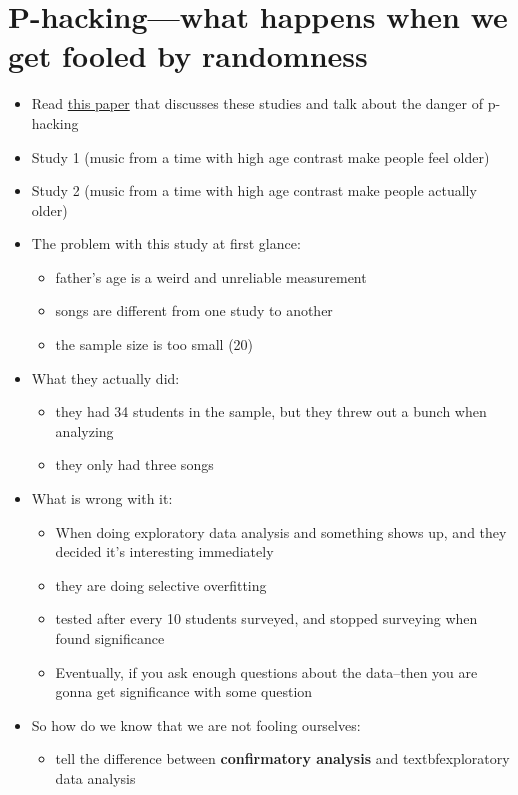 \section{P-hacking---what happens when we get fooled by randomness}
\begin{itemize}
    \item Read \href{https://journals.sagepub.com/doi/10.1177/0956797611417632}{this paper} that discusses these studies and talk about the danger of p-hacking
    \item Study 1 (music from a time with high age contrast make people feel older)
    \item Study 2 (music from a time with high age contrast make people actually older)
    \item The problem with this study at first glance:
    \begin{itemize}
        \item father's age is a weird and unreliable measurement
        \item songs are different from one study to another
        \item the sample size is too small (20)
    \end{itemize}
    \item What they actually did:
    \begin{itemize}
        \item they had 34 students in the sample, but they threw out a bunch when analyzing 
        \item they only had three songs
    \end{itemize}
    \item What is wrong with it:
    \begin{itemize}
        \item When doing exploratory data analysis and something shows up, and they decided it’s interesting immediately 
        \item they are doing selective overfitting
        \item tested after every 10 students surveyed, and stopped surveying when found significance
        \item Eventually, if you ask enough questions about the data--then you are gonna get significance with some question
    \end{itemize}
    \item So how do we know that we are not fooling ourselves:
    \begin{itemize}
        \item tell the difference between \textbf{confirmatory analysis} and textbf{exploratory data analysis}

\end{itemize}
\end{itemize}
